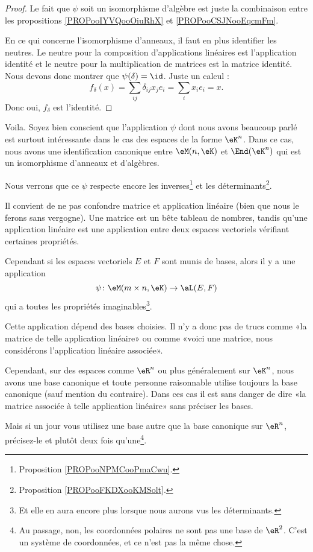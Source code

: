 \begin{proof}
    Le fait que \( \psi\) soit un isomorphisme d'algèbre est juste la combinaison entre les propositions \ref{PROPooIYVQooOiuRhX} et \ref{PROPooCSJNooEqcmFm}.

    En ce qui concerne l'isomorphisme d'anneaux, il faut en plus identifier les neutres. Le neutre pour la composition d'applications linéaires est l'application identité et le neutre pour la multiplication de matrices est la matrice identité. Nous devons donc montrer que \( \psi(\delta)=\id\). Juste un calcul :
    \begin{equation}
        f_{\delta}(x)=\sum_{ij}\delta_{ij}x_je_i=\sum_ix_ie_i=x.
    \end{equation}
    Donc oui, \( f_{\delta}\) est l'identité.
\end{proof}

Voila. Soyez bien conscient que l'application \( \psi\) dont nous avons beaucoup parlé est surtout intéressante dans le cas des espaces de la forme \( \eK^n\). Dans ce cas, nous avons une identification canonique entre \( \eM(n,\eK)\) et \( \End(\eK^n)\) qui est un isomorphisme d'anneaux et d'algèbres.

Nous verrons que ce \( \psi\) respecte encore les inverses\footnote{Proposition \ref{PROPooNPMCooPmaCwu}.} et les déterminants\footnote{Proposition \ref{PROPooFKDXooKMSolt}.}.

\begin{normaltext}
    Il convient de ne pas confondre matrice et application linéaire (bien que nous le ferons sans vergogne). Une matrice est un bête tableau de nombres, tandis qu'une application linéaire est une application entre deux espaces vectoriels vérifiant certaines propriétés.

    Cependant si les espaces vectoriels \( E\) et \( F\) sont munis de bases, alors il y a une application
    \begin{equation}
        \psi\colon \eM(m\times n,\eK)\to \aL(E,F)
    \end{equation}
    qui a toutes les propriétés imaginables\footnote{Et elle en aura encore plus lorsque nous aurons vus les déterminants.}.

    Cette application dépend des bases choisies. Il n'y a donc pas de trucs comme «la matrice de telle application linéaire» ou comme «voici une matrice, nous considérons l'application linéaire associée». 

    Cependant, sur des espaces comme \( \eR^n\) ou plus généralement sur \( \eK^n\), nous avons une base canonique et toute personne raisonnable utilise toujours la base canonique (sauf mention du contraire). Dans ces cas il est sans danger de dire «la matrice associée à telle application linéaire» sans préciser les bases.

    Mais si un jour vous utilisez une base autre que la base canonique sur \( \eR^n\), précisez-le et plutôt deux fois qu'une\footnote{Au passage, non, les coordonnées polaires ne sont pas une base de \( \eR^2\). C'est un système de coordonnées, et ce n'est pas la même chose.}.
\end{normaltext}

